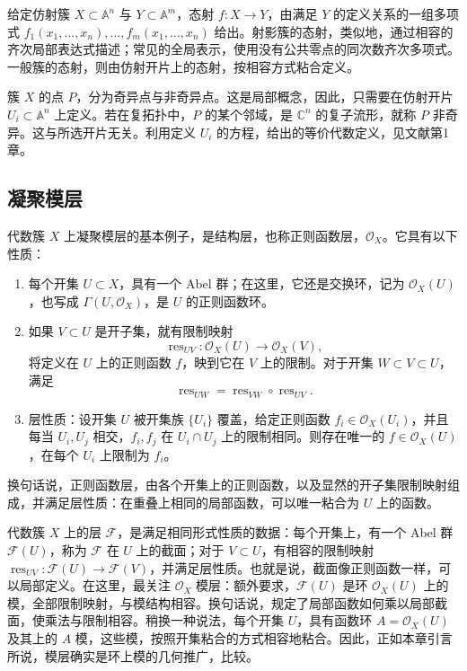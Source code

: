 给定仿射簇 $X\subset\mathbb{A}^n$ 与 $Y\subset\mathbb{A}^m$，态射 $f\colon X\to Y$，由满足 $Y$ 的定义关系的一组多项式 $f_1(x_1,\ldots,x_n),\ldots,f_m(x_1,\ldots,x_n)$ 给出。射影簇的态射，类似地，通过相容的齐次局部表达式描述；常见的全局表示，使用没有公共零点的同次数齐次多项式。一般簇的态射，则由仿射开片上的态射，按相容方式粘合定义。

簇 $X$ 的点 $P$，分为奇异点与非奇异点。这是局部概念，因此，只需要在仿射开片 $U_i\subset\mathbb{A}^n$ 上定义。若在复拓扑中，$P$ 的某个邻域，是 $\mathbb{C}^n$ 的复子流形，就称 $P$ 非奇异。这与所选开片无关。利用定义 $U_i$ 的方程，给出的等价代数定义，见文献第1章。

\subsection{凝聚模层}\label{sec:4.3.2}

代数簇 $X$ 上凝聚模层的基本例子，是结构层，也称正则函数层，$\mathcal{O}_X$。它具有以下性质：
\begin{definition*}\label{def:4.structure-sheaf}
\begin{enumerate}[label=(\arabic*)]
\item 每个开集 $U\subset X$，具有一个 Abel 群；在这里，它还是交换环，记为 $\mathcal{O}_X(U)$，也写成 $\Gamma(U,\mathcal{O}_X)$，是 $U$ 的正则函数环。
\item 如果 $V\subset U$ 是开子集，就有限制映射
\[
\operatorname{res}_{UV}\colon\mathcal{O}_X(U)\longrightarrow\mathcal{O}_X(V),
\]
将定义在 $U$ 上的正则函数 $f$，映到它在 $V$ 上的限制。对于开集 $W\subset V\subset U$，满足
\[
\operatorname{res}_{UW}=\operatorname{res}_{VW}\circ\operatorname{res}_{UV}.
\]
\item 层性质：设开集 $U$ 被开集族 $\{U_i\}$ 覆盖，给定正则函数 $f_i\in\mathcal{O}_X(U_i)$，并且每当 $U_i,U_j$ 相交，$f_i,f_j$ 在 $U_i\cap U_j$ 上的限制相同。则存在唯一的 $f\in\mathcal{O}_X(U)$，在每个 $U_i$ 上限制为 $f_i$。
\end{enumerate}
\end{definition*}
换句话说，正则函数层，由各个开集上的正则函数，以及显然的开子集限制映射组成，并满足层性质：在重叠上相同的局部函数，可以唯一粘合为 $U$ 上的函数。

代数簇 $X$ 上的层 $\mathcal{F}$，是满足相同形式性质的数据：每个开集上，有一个 Abel 群 $\mathcal{F}(U)$，称为 $\mathcal{F}$ 在 $U$ 上的截面；对于 $V\subset U$，有相容的限制映射 $\operatorname{res}_{UV}\colon\mathcal{F}(U)\to\mathcal{F}(V)$，并满足层性质。也就是说，截面像正则函数一样，可以局部定义。在这里，最关注 $\mathcal{O}_X$ 模层：额外要求，$\mathcal{F}(U)$ 是环 $\mathcal{O}_X(U)$ 上的模，全部限制映射，与模结构相容。换句话说，规定了局部函数如何乘以局部截面，使乘法与限制相容。稍换一种说法，每个开集 $U$，具有函数环 $A=\mathcal{O}_X(U)$ 及其上的 $A$ 模，这些模，按照开集粘合的方式相容地粘合。因此，正如本章引言所说，模层确实是环上模的几何推广，比较。

